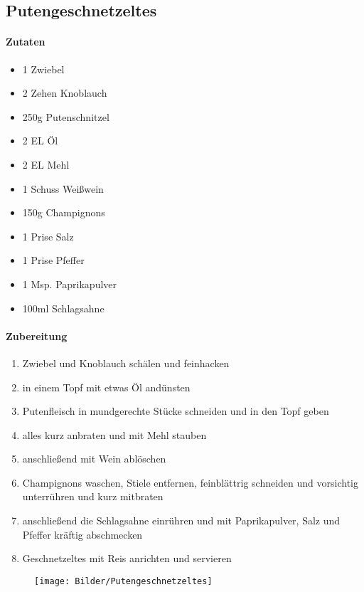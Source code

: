 \newpage
\subsection{Putengeschnetzeltes}
\paragraph{Zutaten}
\begin{itemize}[noitemsep]
	\item 1 Zwiebel
	\item 2 Zehen Knoblauch
	\item 250g Putenschnitzel
	\item 2 EL Öl
	\item 2 EL Mehl
	\item 1 Schuss Weißwein
	\item 150g Champignons 
	\item 1 Prise Salz
	\item 1 Prise Pfeffer
	\item 1 Msp. Paprikapulver
	\item 100ml Schlagsahne
\end{itemize}
\paragraph{Zubereitung}
\begin{enumerate}[noitemsep]
	\item Zwiebel und Knoblauch schälen und feinhacken 
	\item in einem Topf mit etwas Öl andünsten 
	\item Putenfleisch in mundgerechte Stücke schneiden und in den Topf geben
	\item alles kurz anbraten und mit Mehl stauben
	\item anschließend mit Wein ablöschen 
	\item Champignons waschen, Stiele entfernen, feinblättrig schneiden und vorsichtig unterrühren und kurz mitbraten
	\item anschließend die Schlagsahne einrühren und mit Paprikapulver, Salz und Pfeffer kräftig abschmecken 
	\item Geschnetzeltes mit Reis anrichten und servieren
\end{enumerate}
\begin{figure}[h]
\centering
\texttt{[image: Bilder/Putengeschnetzeltes]}
\end{figure}
